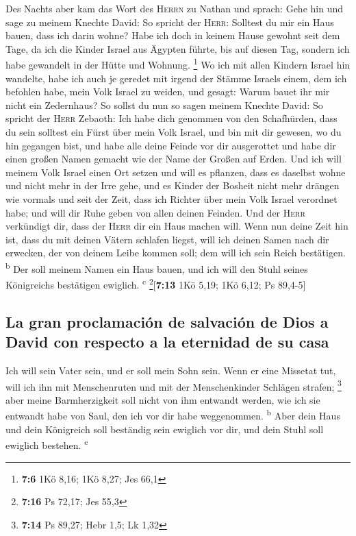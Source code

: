  Des Nachts aber kam das Wort des \textsc{Herrn} zu Nathan
und sprach:  Gehe hin und sage zu meinem Knechte David: So
spricht der \textsc{Herr}: Solltest du mir ein Haus bauen, dass ich
darin wohne?  Habe ich doch in keinem Hause gewohnt seit
dem Tage, da ich die Kinder Israel aus Ägypten führte, bis auf diesen
Tag, sondern ich habe gewandelt in der Hütte und Wohnung. \footnote{\textbf{7:6}
  1Kö 8,16; 1Kö 8,27; Jes 66,1}  Wo ich mit allen Kindern
Israel hin wandelte, habe ich auch je geredet mit irgend der Stämme
Israels einem, dem ich befohlen habe, mein Volk Israel zu weiden, und
gesagt: Warum bauet ihr mir nicht ein Zedernhaus?  So
sollst du nun so sagen meinem Knechte David: So spricht der
\textsc{Herr} Zebaoth: Ich habe dich genommen von den Schafhürden, dass
du sein solltest ein Fürst über mein Volk Israel,  und bin
mit dir gewesen, wo du hin gegangen bist, und habe alle deine Feinde vor
dir ausgerottet und habe dir einen großen Namen gemacht wie der Name der
Großen auf Erden.  Und ich will meinem Volk Israel einen
Ort setzen und will es pflanzen, dass es daselbst wohne und nicht mehr
in der Irre gehe, und es Kinder der Bosheit nicht mehr drängen wie
vormals und seit der Zeit, dass ich Richter über mein Volk Israel
verordnet habe;  und will dir Ruhe geben von allen deinen
Feinden. Und der \textsc{Herr} verkündigt dir, dass der \textsc{Herr}
dir ein Haus machen will.  Wenn nun deine Zeit hin ist,
dass du mit deinen Vätern schlafen liegst, will ich deinen Samen nach
dir erwecken, der von deinem Leibe kommen soll; dem will ich sein Reich
bestätigen. \textsuperscript{b}  Der soll meinem Namen
ein Haus bauen, und ich will den Stuhl seines Königreichs bestätigen
ewiglich. \textsuperscript{c} \footnote{\textbf{7:16} Ps 72,17; Jes 55,3}{[}\textbf{7:13}
1Kö 5,19; 1Kö 6,12; Ps 89,4-5{]}

\hypertarget{la-gran-proclamaciuxf3n-de-salvaciuxf3n-de-dios-a-david-con-respecto-a-la-eternidad-de-su-casa}{%
\subsection{La gran proclamación de salvación de Dios a David con
respecto a la eternidad de su
casa}\label{la-gran-proclamaciuxf3n-de-salvaciuxf3n-de-dios-a-david-con-respecto-a-la-eternidad-de-su-casa}}

 Ich will sein Vater sein, und er soll mein Sohn sein.
Wenn er eine Missetat tut, will ich ihn mit Menschenruten und mit der
Menschenkinder Schlägen strafen; \footnote{\textbf{7:14} Ps 89,27; Hebr
  1,5; Lk 1,32}  aber meine Barmherzigkeit soll nicht von
ihm entwandt werden, wie ich sie entwandt habe von Saul, den ich vor dir
habe weggenommen. \textsuperscript{b}  Aber dein Haus und
dein Königreich soll beständig sein ewiglich vor dir, und dein Stuhl
soll ewiglich bestehen. \textsuperscript{c}

